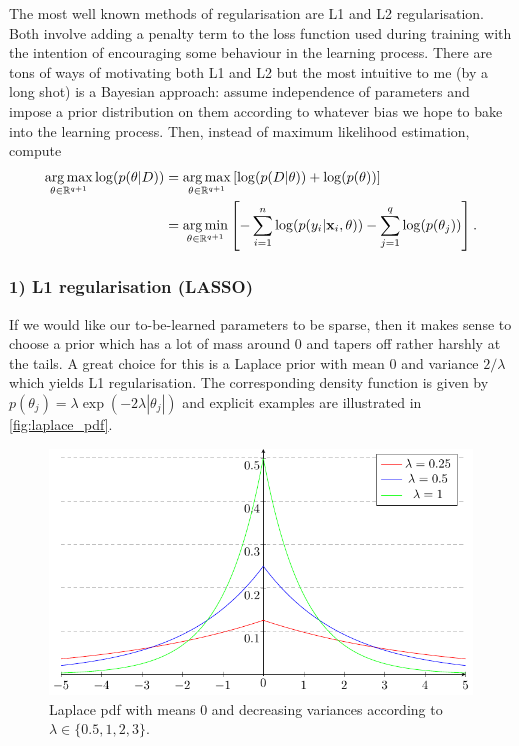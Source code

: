 \documentclass[11pt]{article}
\begin{document}
The most well known methods of regularisation are L1 and L2 regularisation. Both involve adding a penalty term to the loss function used during training with the intention of encouraging some behaviour in the learning process. There are tons of ways of motivating both L1 and L2 but the most intuitive to me (by a long shot) is a Bayesian approach: assume independence of parameters and impose a prior distribution on them according to whatever bias we hope to bake into the learning process. Then, instead of maximum likelihood estimation, compute
\begin{align*}
    \operatorname*{arg\,max}_{\theta\in\mathbb{R}^{q+1}}\log(p(\theta|D))
    &=
    \operatorname*{arg\,max}_{\theta\in\mathbb{R}^{q+1}}\left[\log(p(D|\theta))+\log(p(\theta))\right]\\
    &=
    \operatorname*{arg\,min}_{\theta\in\mathbb{R}^{q+1}}\left[-\sum_{i=1}^n\log(p(y_i|\mathbf{x}_i,\theta))-\sum_{j=1}^q\log(p(\theta_j))\right].
\end{align*}

\subsubsection*{1) L1 regularisation (LASSO)}
If we would like our to-be-learned parameters to be sparse, then it makes sense to choose a prior which has a lot of mass around 0 and tapers off rather harshly at the tails. A great choice for this is a Laplace prior with mean 0 and variance $2/\lambda$ which yields L1 regularisation. The corresponding density function is given by $p(\theta_j)=\lambda\exp(-2\lambda|\theta_j|)$ and explicit examples are illustrated in \autoref{fig:laplace_pdf}.

\begin{figure}[t]
    \centering
    \includegraphics[width=\columnwidth]{./figures/supervised_learning/laplace_pdf.pdf}
    \caption{Laplace pdf with means 0 and decreasing variances according to $\lambda\in\{0.5,1,2,3\}$.}
    \label{fig:laplace_pdf}
\end{figure}
\end{document}
